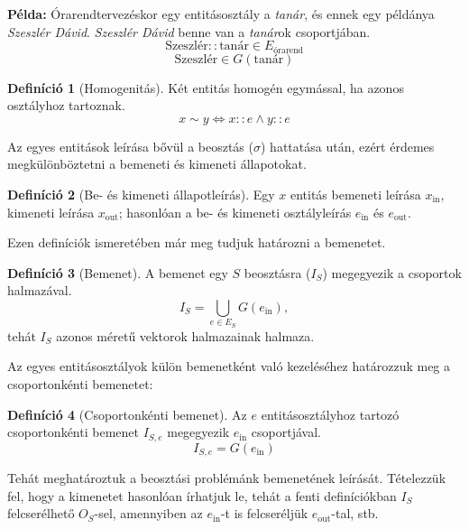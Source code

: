 \documentclass[twocolumn]{article}
\theoremstyle{definition}
\newtheorem{definition}{Definíció}[section]
\newcommand{\subin}[1]{ {#1}_{\text{in}} }
\newcommand{\subout}[1]{ {#1}_{\text{out}} }
\newcommand{\pl}{ \textbf{Példa:} }
\begin{document}
    \pl Órarendtervezéskor egy entitásosztály a \textit{tanár}, és ennek egy példánya \textit{Szeszlér Dávid}. \textit{Szeszlér Dávid} benne van a \textit{tanár}ok csoportjában.
    $$ \text{Szeszlér} :: \text{tanár} \in E_{\text{órarend}} $$
    $$ \text{Szeszlér} \in G(\text{tanár})$$
    
    
    \begin{definition}[Homogenitás]
        Két entitás homogén egymással, ha azonos osztályhoz tartoznak.
        \begin{equation}
            x \sim y \Longleftrightarrow x :: e \wedge y :: e
        \end{equation}
    \end{definition}
    
    Az egyes entitások leírása bővül a beosztás ($\sigma$) hattatása után, ezért érdemes megkülönböztetni a bemeneti és kimeneti állapotokat.
    
    \begin{definition}[Be- és kimeneti állapotleírás]
        Egy $x$ entitás bemeneti leírása $\subin{x}$, kimeneti leírása $\subout{x}$; hasonlóan a be- és kimeneti osztályleírás $\subin{e}$ és $\subout{e}$.
    \end{definition}
    
    Ezen definíciók ismeretében már meg tudjuk határozni a bemenetet.
    
    \begin{definition}[Bemenet]
        A bemenet egy $S$ beosztásra ($I_S$) megegyezik a csoportok halmazával.
        \begin{equation}
            I_S = \bigcup_{e \in E_S} G(\subin{e}),
        \end{equation}
        tehát $I_S$ azonos méretű vektorok halmazainak halmaza.
    \end{definition}
    
    Az egyes entitásosztályok külön bemenetként való kezeléséhez határozzuk meg a csoportonkénti bemenetet:
    
    \begin{definition}[Csoportonkénti bemenet]
        Az $e$ entitásosztályhoz tartozó csoportonkénti bemenet $I_{S, e}$ megegyezik $\subin{e}$ csoportjával.
        \begin{equation}
            I_{S, e} = G(\subin{e})
        \end{equation}
    \end{definition}
    
    Tehát meghatároztuk a beosztási problémánk bemenetének leírását. Tételezzük fel, hogy a kimenetet hasonlóan írhatjuk le, tehát a fenti definíciókban $I_S$ felcserélhető $O_S$-sel, amennyiben az $\subin{e}$-t is felcseréljük $\subout{e}$-tal, stb.
    
\end{document}
